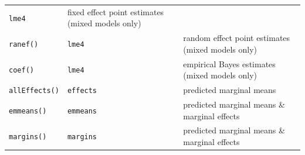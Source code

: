 \documentclass[
]{book}
\begin{document}
\begin{longtable}[]{@{}lll@{}}
\begin{minipage}[t]{0.17\columnwidth}
\texttt{lme4}\strut
\end{minipage} & \begin{minipage}[t]{0.59\columnwidth}\raggedright
fixed effect point estimates (mixed models only)\strut
\end{minipage}\tabularnewline
\begin{minipage}[t]{0.16\columnwidth}\raggedright
\texttt{ranef()}\strut
\end{minipage} & \begin{minipage}[t]{0.17\columnwidth}\raggedright
\texttt{lme4}\strut
\end{minipage} & \begin{minipage}[t]{0.59\columnwidth}\raggedright
random effect point estimates (mixed models only)\strut
\end{minipage}\tabularnewline
\begin{minipage}[t]{0.16\columnwidth}\raggedright
\texttt{coef()}\strut
\end{minipage} & \begin{minipage}[t]{0.17\columnwidth}\raggedright
\texttt{lme4}\strut
\end{minipage} & \begin{minipage}[t]{0.59\columnwidth}\raggedright
empirical Bayes estimates (mixed models only)\strut
\end{minipage}\tabularnewline
\begin{minipage}[t]{0.16\columnwidth}\raggedright
\texttt{allEffects()}\strut
\end{minipage} & \begin{minipage}[t]{0.17\columnwidth}\raggedright
\texttt{effects}\strut
\end{minipage} & \begin{minipage}[t]{0.59\columnwidth}\raggedright
predicted marginal means\strut
\end{minipage}\tabularnewline
\begin{minipage}[t]{0.16\columnwidth}\raggedright
\texttt{emmeans()}\strut
\end{minipage} & \begin{minipage}[t]{0.17\columnwidth}\raggedright
\texttt{emmeans}\strut
\end{minipage} & \begin{minipage}[t]{0.59\columnwidth}\raggedright
predicted marginal means \& marginal effects\strut
\end{minipage}\tabularnewline
\begin{minipage}[t]{0.16\columnwidth}\raggedright
\texttt{margins()}\strut
\end{minipage} & \begin{minipage}[t]{0.17\columnwidth}\raggedright
\texttt{margins}\strut
\end{minipage} & \begin{minipage}[t]{0.59\columnwidth}\raggedright
predicted marginal means \& marginal effects\strut
\end{minipage}\tabularnewline
\bottomrule
\end{longtable}
\end{document}
